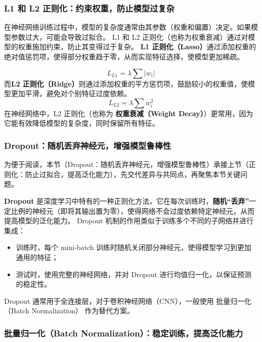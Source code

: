  \subsubsection*{ L1 和 L2 正则化：约束权重，防止模型过复杂}
在神经网络训练过程中，模型的复杂度通常由其参数（权重和偏置）决定。如果模型参数过大，可能会导致过拟合。
L1 和 L2 正则化（也称为权重衰减）通过对模型的权重施加约束，防止其变得过于复杂。
 {\bf L1 正则化（Lasso）}通过添加权重的绝对值惩罚项，使得部分权重趋于零，从而实现特征选择，使模型更加稀疏。


    \[
  L_{L1} = \lambda \sum |w_i|
  \]
而{\bf L2 正则化（Ridge）}则通过添加权重的平方惩罚项，鼓励较小的权重值，使模型更加平滑，避免对个别特征过度依赖。
  \[
  L_{L2} = \lambda \sum w_i^2
  \]
在神经网络中，L2 正则化（也称为 {\bf 权重衰减（Weight Decay）}）更常用，因为它能有效降低模型的复杂度，同时保留所有特征。

\subsubsection*{Dropout：随机丢弃神经元，增强模型鲁棒性}


为便于阅读，本节（Dropout：随机丢弃神经元，增强模型鲁棒性）承接上节（正则化：防止过拟合，提高泛化能力），先交代差异与共同点，再聚焦本节关键问题。

{\bf Dropout} 是深度学习中特有的一种正则化方法，它在每次训练时，{\bf 随机“丢弃”}一定比例的神经元（即将其输出置为零），使得网络不会过度依赖特定神经元，从而提高模型的泛化能力。
Dropout 机制的作用类似于训练多个不同的子网络并进行集成：
\begin{itemize}
\item {\bf  } 训练时，每个 mini-batch 训练时随机关闭部分神经元，使得模型学习到更加通用的特征；
\item {\bf  } 测试时，使用完整的神经网络，并对 Dropout 进行均值归一化，以保证预测的稳定性。
\end{itemize}
Dropout 通常用于全连接层，对于卷积神经网络（CNN），一般使用 批量归一化（Batch Normalization） 作为替代方案。


\subsubsection*{ 批量归一化（Batch Normalization）：稳定训练，提高泛化能力}

